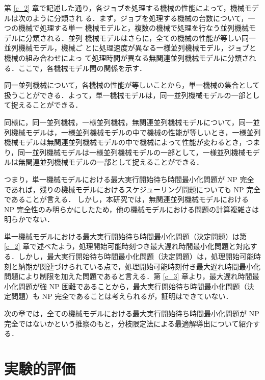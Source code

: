 \documentclass[12pt]{optlab-bachelor}
\begin{document}

第 \ref{c_2} 章で記述した通り，各ジョブを処理する機械の性能によって，機械モデルは次のように分類され
る．まず，ジョブを処理する機械の台数について，一つの機械で処理する単一
機械モデルと，複数の機械で処理を行なう並列機械モデルに分類される．並列
機械モデルはさらに，全ての機械の性能が等しい同一並列機械モデル，機械ご
とに処理速度が異なる一様並列機械モデル，ジョブと機械の組み合わせによっ
て処理時間が異なる無関連並列機械モデルに分類される．ここで，各機械モデル間の関係を示す．

同一並列機械について，各機械の性能が等しいことから，単一機械の集合として扱うことができる．よって，単一機械モデルは，同一並列機械モデルの一部として捉えることができる．

同様に，同一並列機械，一様並列機械，無関連並列機械モデルについて，同一並列機械モデルは，一様並列機械モデルの中で機械の性能が等しいとき，一様並列機械モデルは無関連並列機械モデルの中で機械によって性能が変わるとき，つまり，同一並列機械モデルは一様並列機械モデルの一部として，一様並列機械モデルは無関連並列機械モデルの一部として捉えることができる．

つまり，単一機械モデルにおける最大実行開始待ち時間最小化問題が NP 完全であれば，残りの機械モデルにおけるスケジューリング問題についても NP 完全であることが言える．
しかし，本研究では，無関連並列機械モデルにおける NP 完全性のみ明らかにしたため，他の機械モデルにおける問題の計算複雑さは明らかでない．

単一機械モデルにおける最大実行開始待ち時間最小化問題（決定問題）は第 \ref{c_2} 章で述べたよう，処理開始可能時刻つき最大遅れ時間最小化問題と対応する．しかし，最大実行開始待ち時間最小化問題（決定問題）は，処理開始可能時刻と納期が関連づけられている点で，処理開始可能時刻付き最大遅れ時間最小化問題により制限を加えた問題であると言える．第 \ref{c_3} 章より，最大遅れ時間最小化問題が強 NP 困難であることから，最大実行開始待ち時間最小化問題（決定問題）も NP 完全であることは考えられるが，証明はできていない．

次の章では，全ての機械モデルにおける最大実行開始待ち時間最小化問題が NP 完全ではないかという推察のもと，分枝限定法による最適解導出について紹介する．

\chapter{実験的評価}\label{c_5}
\end{document}
